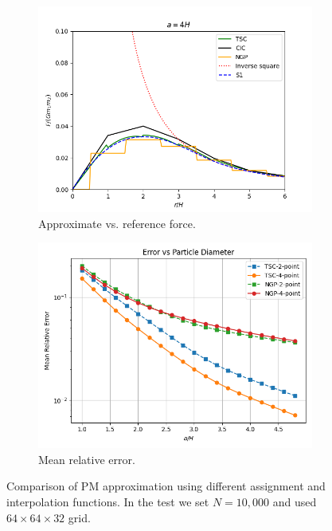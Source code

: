 \begin{figure}[htp]
    \centering
    \begin{subfigure}[b]{0.48\textwidth}
        \centering
        \includegraphics[width=\textwidth]{chapters/p3m-method/img/field_different_ass.png}
        \caption{Approximate vs. reference force.}
        \label{fig:reference-force-approx-different-schemes-sub}
    \end{subfigure}
    \hfill
    \begin{subfigure}[b]{0.48\textwidth}
        \centering
        \includegraphics[width=\textwidth]{chapters/p3m-method/img/no-cic.png}
        \caption{Mean relative error.}
        \label{fig:reference-force-error-different-schemes-sub}
    \end{subfigure}
    \caption{Comparison of PM approximation using different assignment and interpolation functions.
    In the test we set $N=10{,}000$ and used $64\times 64\times 32$ grid.
    }
    \label{fig:reference-force-err-schemes-combined}
\end{figure}
